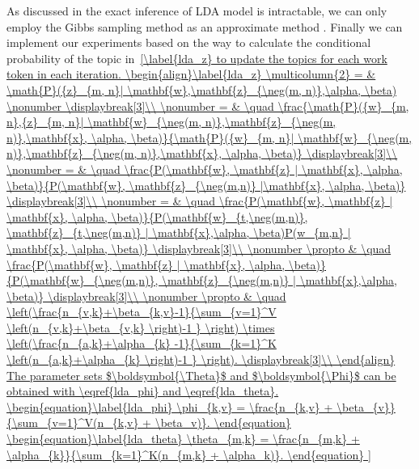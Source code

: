 As discussed in \cite{newman2007distributed} the exact inference of LDA model is intractable, we can only employ the Gibbs sampling method as an approximate method \cite{griffiths2002gibbs}. Finally we can implement our experiments based on the way to calculate the conditional probability of the topic in~\ref{\label{lda_z} to update the topics for each work token in each iteration. 

\begin{align}\label{lda_z}
\multicolumn{2} =   &  \math{P}({z}_{m, n}| \mathbf{w},\mathbf{z}_{\neg(m, n)},\alpha, \beta)  \nonumber
\displaybreak[3]\\ \nonumber
= & \quad \frac{\math{P}({w}_{m, n},{z}_{m, n}| \mathbf{w}_{\neg(m, n)},\mathbf{z}_{\neg(m, n)},\mathbf{x}, \alpha, \beta)}{\math{P}({w}_{m, n}| \mathbf{w}_{\neg(m, n)},\mathbf{z}_{\neg(m, n)},\mathbf{x}, \alpha, \beta)}
\displaybreak[3]\\ \nonumber
= & \quad \frac{P(\mathbf{w}, \mathbf{z} | \mathbf{x}, \alpha, \beta)}{P(\mathbf{w}, \mathbf{z}_{\neg(m,n)} |\mathbf{x}, \alpha, \beta)} \displaybreak[3]\\ \nonumber
= & \quad \frac{P(\mathbf{w}, \mathbf{z} | \mathbf{x}, \alpha, \beta)}{P(\mathbf{w}_{t,\neg(m,n)}, \mathbf{z}_{t,\neg(m,n)} | \mathbf{x},\alpha, \beta)P(w_{m,n} | \mathbf{x}, \alpha, \beta)} \displaybreak[3]\\ \nonumber
\propto & \quad \frac{P(\mathbf{w}, \mathbf{z} | \mathbf{x}, \alpha, \beta)}{P(\mathbf{w}_{\neg(m,n)}, \mathbf{z}_{\neg(m,n)} | \mathbf{x},\alpha, \beta)} \displaybreak[3]\\ \nonumber 
\propto & \quad  \left(\frac{n_{v,k}+\beta_{k,v}-1}{\sum_{v=1}^V \left(n_{v,k}+\beta_{v,k} \right)-1 } \right) \times   \left(\frac{n_{a,k}+\alpha_{k} -1}{\sum_{k=1}^K \left(n_{a,k}+\alpha_{k} \right)-1 } \right).
\displaybreak[3]\\
\end{align}

The parameter sets $\boldsymbol{\Theta}$ and $\boldsymbol{\Phi}$ can be obtained with \eqref{lda_phi} and \eqref{lda_theta}.

\begin{equation}\label{lda_phi}
\phi_{k,v} = \frac{n_{k,v} + \beta_{v}}{\sum_{v=1}^V(n_{k,v} + \beta_v)}.
\end{equation}

\begin{equation}\label{lda_theta}
\theta_{m,k} = \frac{n_{m,k} + \alpha_{k}}{\sum_{k=1}^K(n_{m,k} + \alpha_k)}.
\end{equation}

}
